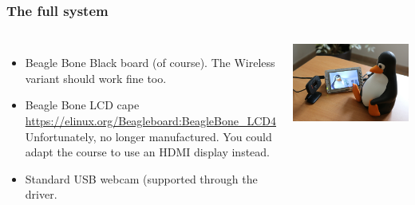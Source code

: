 \begin{frame}
  \frametitle{The full system}
  \begin{columns}
    \begin{itemize}
	\item Beagle Bone Black board (of course). The Wireless variant
	      should work fine too.
	\item Beagle Bone LCD cape\\
              \url{https://elinux.org/Beagleboard:BeagleBone_LCD4}\\
	      Unfortunately, no longer manufactured. You could adapt
	      the course to use an HDMI display instead.
        \item Standard USB webcam (supported through the 
	      driver.
    \end{itemize}
     \includegraphics[width=\textwidth]{slides/beaglecam/beaglecam.jpg}
  \end{columns}
\end{frame}



